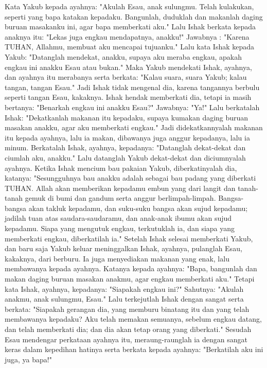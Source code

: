 \begin{biblechapter}
\verse Kata Yakub kepada ayahnya: "Akulah Esau, anak sulungmu. Telah kulakukan, seperti yang bapa katakan kepadaku. Bangunlah, duduklah dan makanlah daging buruan masakanku ini, agar bapa memberkati aku."
\verse Lalu Ishak berkata kepada anaknya itu: "Lekas juga engkau mendapatnya, anakku!" Jawabnya : "Karena TUHAN, Allahmu, membuat aku mencapai tujuanku."
\verse Lalu kata Ishak kepada Yakub: "Datanglah mendekat, anakku, supaya aku meraba engkau, apakah engkau ini anakku Esau atau bukan."
\verse Maka Yakub mendekati Ishak, ayahnya, dan ayahnya itu merabanya serta berkata: "Kalau suara, suara Yakub; kalau tangan, tangan Esau."
\verse Jadi Ishak tidak mengenal dia, karena tangannya berbulu seperti tangan Esau, kakaknya. Ishak hendak memberkati dia,
\verse tetapi ia masih bertanya: "Benarkah engkau ini anakku Esau?" Jawabnya: "Ya!"
\verse Lalu berkatalah Ishak: "Dekatkanlah makanan itu kepadaku, supaya kumakan daging buruan masakan anakku, agar aku memberkati engkau." Jadi didekatkannyalah makanan itu kepada ayahnya, lalu ia makan, dibawanya juga anggur kepadanya, lalu ia minum.
\verse Berkatalah Ishak, ayahnya, kepadanya: "Datanglah dekat-dekat dan ciumlah aku, anakku."
\verse Lalu datanglah Yakub dekat-dekat dan diciumnyalah ayahnya. Ketika Ishak mencium bau pakaian Yakub, diberkatinyalah dia, katanya: "Sesungguhnya bau anakku adalah sebagai bau padang yang diberkati TUHAN.
\verse Allah akan memberikan kepadamu embun yang dari langit dan tanah-tanah gemuk di bumi dan gandum serta anggur berlimpah-limpah.
\verse Bangsa-bangsa akan takluk kepadamu, dan suku-suku bangsa akan sujud kepadamu; jadilah tuan atas saudara-saudaramu, dan anak-anak ibumu akan sujud kepadamu. Siapa yang mengutuk engkau, terkutuklah ia, dan siapa yang memberkati engkau, diberkatilah ia."
\verse Setelah Ishak selesai memberkati Yakub, dan baru saja Yakub keluar meninggalkan Ishak, ayahnya, pulanglah Esau, kakaknya, dari berburu.
\verse Ia juga menyediakan makanan yang enak, lalu membawanya kepada ayahnya. Katanya kepada ayahnya: "Bapa, bangunlah dan makan daging buruan masakan anakmu, agar engkau memberkati aku."
\verse Tetapi kata Ishak, ayahnya, kepadanya: "Siapakah engkau ini?" Sahutnya: "Akulah anakmu, anak sulungmu, Esau."
\verse Lalu terkejutlah Ishak dengan sangat serta berkata: "Siapakah gerangan dia, yang memburu binatang itu dan yang telah membawanya kepadaku? Aku telah memakan semuanya, sebelum engkau datang, dan telah memberkati dia; dan dia akan tetap orang yang diberkati."
\verse Sesudah Esau mendengar perkataan ayahnya itu, meraung-raunglah ia dengan sangat keras dalam kepedihan hatinya serta berkata kepada ayahnya: "Berkatilah aku ini juga, ya bapa!"

\end{biblechapter}
